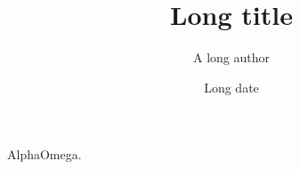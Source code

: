 \documentclass[11pt,aspectratio=169]{beamer}
\title[Short title]{Long title}\author[Workshop]{A long author}\institute[Institute]{A long institute}\date[FY2025]{Long date}
\begin{document}
\begin{frame}{Alpha}Omega.\end{frame}
\end{document}
